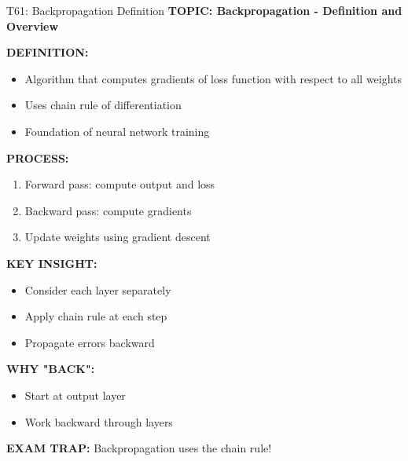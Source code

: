 \documentclass[8pt]{beamer}
\begin{document}
	\begin{frame}{T61: Backpropagation Definition}
		\fontsize{6.5}{7.5}\selectfont
		\textbf{TOPIC: Backpropagation - Definition and Overview}
		
		\vspace{0.1cm}
		\textbf{DEFINITION:}
		\begin{itemize}
			\item Algorithm that computes gradients of loss function with respect to all weights
			\item Uses chain rule of differentiation
			\item Foundation of neural network training
		\end{itemize}
		
		\vspace{0.1cm}
		\textbf{PROCESS:}
		\begin{enumerate}
			\item Forward pass: compute output and loss
			\item Backward pass: compute gradients
			\item Update weights using gradient descent
		\end{enumerate}
		
		\vspace{0.1cm}
		\textbf{KEY INSIGHT:}
		\begin{itemize}
			\item Consider each layer separately
			\item Apply chain rule at each step
			\item Propagate errors backward
		\end{itemize}
		
		\vspace{0.1cm}
		\textbf{WHY "BACK":}
		\begin{itemize}
			\item Start at output layer
			\item Work backward through layers
		\end{itemize}
		
		\textcolor{myred}{\textbf{EXAM TRAP:}} Backpropagation uses the \textcolor{myblue}{chain rule}!
	\end{frame}
	
\end{document}
